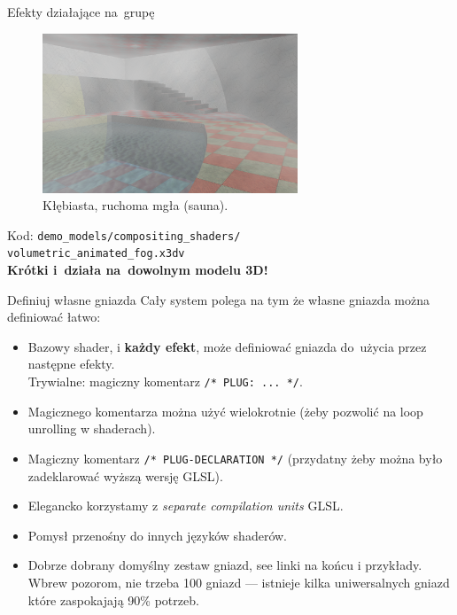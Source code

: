 \documentclass{beamer}
\begin{document}
\begin{frame}{Efekty działające na~grupę}

\begin{figure}
  \centering
  \includegraphics[width=3in]{../volumetric_animated_fog_all}
  \caption{Kłębiasta, ruchoma mgła (sauna).}
\end{figure}

Kod: \texttt{demo\_models/compositing\_shaders/\\volumetric\_animated\_fog.x3dv}\\
\textbf{Krótki i~działa na~dowolnym modelu 3D!}


\end{frame}

\begin{frame}{Definiuj własne gniazda}
Cały system polega na tym że własne gniazda można definiować łatwo:
\begin{itemize}
  \item Bazowy shader, i \textbf{każdy efekt}, może definiować gniazda
    do~użycia przez następne efekty.\\
    Trywialne: magiczny komentarz \texttt{/* PLUG: ... */}.
  \item Magicznego komentarza można użyć wielokrotnie (żeby pozwolić
    na loop unrolling w shaderach).
  \item Magiczny komentarz \texttt{/* PLUG-DECLARATION */}
    (przydatny żeby można było zadeklarować wyższą wersję GLSL).
  \item Elegancko korzystamy z \textit{separate compilation units} GLSL.
  \item Pomysł przenośny do innych języków shaderów.
  \item Dobrze dobrany domyślny zestaw gniazd, see linki na końcu i przykłady.
    Wbrew pozorom, nie trzeba 100 gniazd --- istnieje kilka uniwersalnych
    gniazd które zaspokajają 90\% potrzeb.
\end{itemize}
\end{frame}
\end{document}
